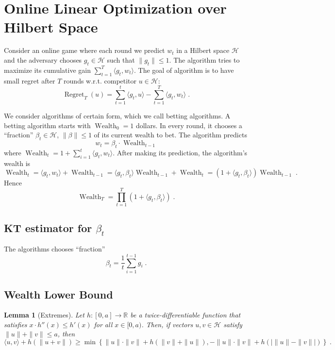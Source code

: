 \documentclass{article}
\DeclareMathOperator{\Regret}{Regret}
\DeclareMathOperator{\Wealth}{Wealth}
\newcommand{\R}{\mathbb{R}}  %
\renewcommand{\H}{\mathcal{H}}
\newtheorem{lemma}[theorem]{Lemma}
\begin{document}
\section{Online Linear Optimization over Hilbert Space}
\label{section:online-linear-optimization-hilbert-space}

Consider an online game where each round we predict $w_t$ in a Hilbert space $\H$
and the adversary chooses $g_t \in \H$ such that $\|g_t\| \le 1$.
The algorithm tries to maximize its cumulative gain $\sum_{t=1}^T \langle g_t, w_t \rangle$.
The goal of algorithm is to have small regret after $T$ rounds w.r.t. competitor $u \in \H$:
$$
\Regret_T(u) = \sum_{t=1}^t \langle g_t, u \rangle - \sum_{t=1}^T \langle g_t, w_t \rangle \; .
$$

We consider algorithms of certain form, which we call betting algorithms.  A
betting algorithm starts with $\Wealth_0 = 1$ dollars.
In every round, it chooses a ``fraction'' $\beta_t \in \H$, $\|\beta\| \le 1$
of its current wealth to bet. The algorithm predicts
$$
w_t = \beta_t \cdot \Wealth_{t-1}
$$
where $\Wealth_t = 1 + \sum_{i=1}^t \langle g_t, w_t \rangle$. After making its prediction,
the algorithm's wealth is
$$
\Wealth_t = \langle g_t, w_t \rangle + \Wealth_{t-1} = \langle g_t, \beta_t \rangle \Wealth_{t-1} + \Wealth_t = (1 + \langle g_t, \beta_t \rangle) \Wealth_{t-1} \; .
$$
Hence
$$
\Wealth_T = \prod_{t=1}^T (1 + \langle g_t, \beta_t \rangle) \; .
$$

\subsection{KT estimator for $\beta_t$}

The algorithms chooses ``fraction''
$$
\beta_t = \frac{1}{t} \sum_{i=1}^{t-1} g_i \; .
$$


\subsection{Wealth Lower Bound}

\begin{lemma}[Extremes]
\label{lemma:extremes}
Let $h:[0,a] \to \R$ be a twice-differentiable function that satisfies $x \cdot h''(x) \le h'(x)$ for all $x \in [0,a)$.
Then, if vectors $u,v \in \H$ satisfy $\|u\| + \|v\| \le a$, then
$$
\langle u, v \rangle + h(\|u + v\|) \ge \min \left\{ \|u\| \cdot \|v\| + h(\|v\| + \|u\|), - \|u\| \cdot \|v\| + h(|\|u\| - \|v\||) \right\} \; .
$$
\end{lemma}
\end{document}

